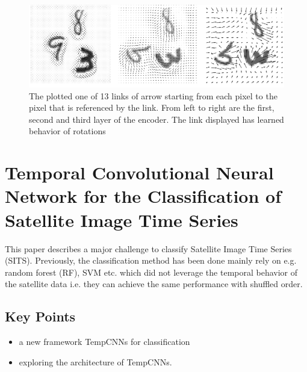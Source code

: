 \documentclass{article}
\begin{document}
\begin{figure}[H]
\centering
\includegraphics[width=\linewidth]{TrajGRU_res}
\caption{The plotted one of 13 links of arrow starting from each pixel to the pixel that is referenced by the link. From left to right are the first, second and third layer of the encoder. The link displayed has learned behavior of rotations}
\end{figure}

\section{Temporal Convolutional Neural Network for the Classification of Satellite Image Time Series}
This paper describes a major challenge to classify Satellite Image Time Series (SITS). Previously, the classification method has been done mainly rely on e.g. random forest (RF), SVM etc. which did not leverage the temporal behavior of the satellite data i.e. they can achieve the same performance with shuffled order.
\subsection{Key Points}
\begin{itemize}
\item a new framework TempCNNs for classification
\item exploring the architecture of TempCNNs.
\end{itemize}
\end{document}
